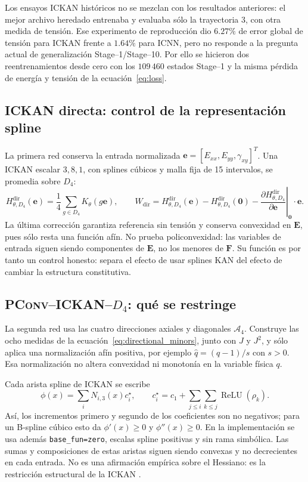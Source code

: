 \documentclass[11pt,a4paper]{article}
\newcommand{\E}{\ensuremath{\bm E}}
\newcommand{\F}{\ensuremath{\bm F}}
\newcommand{\evec}{\ensuremath{\bm e}}
\newcommand{\Dfour}{\ensuremath{D_4}}
\newcommand{\PConvICKAN}{\textsc{PConv--ICKAN--}\Dfour}
\begin{document}
Los ensayos ICKAN históricos no se mezclan con los resultados anteriores: el
mejor archivo heredado entrenaba y evaluaba sólo la trayectoria 3, con otra
medida de tensión. Ese experimento de reproducción dio \(6.27\%\) de error
global de tensión para ICKAN frente a \(1.64\%\) para ICNN, pero no responde a
la pregunta actual de generalización Stage--1/Stage--10. Por ello se hicieron
dos reentrenamientos desde cero con los \(109\,460\) estados Stage--1 y la
misma pérdida de energía y tensión de la ecuación~\eqref{eq:loss}.

\subsection{ICKAN directa: control de la representación spline}

La primera red conserva la entrada normalizada
\(\evec=[E_{xx},E_{yy},\gamma_{xy}]^T\). Una ICKAN escalar
\(3,8,1\), con splines cúbicos y malla fija de 15 intervalos, se promedia
sobre \(\Dfour\):
\[
 H_{\theta,\Dfour}^{\mathrm{dir}}(\evec)
 =\frac14\sum_{g\in\Dfour}K_\theta(g\evec),
 \qquad
 W_{\mathrm{dir}}=H_{\theta,\Dfour}^{\mathrm{dir}}(\evec)
 -H_{\theta,\Dfour}^{\mathrm{dir}}(\bm0)
 -\left.\frac{\partial H_{\theta,\Dfour}^{\mathrm{dir}}}{\partial\evec}
 \right|_{\bm0}\!\cdot\evec.
 \label{eq:ickan-direct}
\]
La última corrección garantiza referencia sin tensión y conserva convexidad
en \(\E\), pues sólo resta una función afín. No prueba policonvexidad: las
variables de entrada siguen siendo componentes de \(\E\), no los menores de
\(\F\). Su función es por tanto un control honesto: separa el efecto de usar
splines KAN del efecto de cambiar la estructura constitutiva.

\subsection{\texorpdfstring{\PConvICKAN{}}{PConv-ICKAN}: qué se restringe}

La segunda red usa las cuatro direcciones axiales y diagonales
\(\mathcal A_4\). Construye las ocho medidas de la
ecuación~\eqref{eq:directional_minors}, junto con \(J\) y \(J^2\), y sólo
aplica una normalización afín positiva, por ejemplo
\(\widehat q=(q-1)/s\) con \(s>0\). Esa normalización no altera convexidad
ni monotonía en la variable física \(q\).

Cada arista spline de ICKAN se escribe
\[
 \phi(x)=\sum_i N_{i,3}(x)c_i^\star,
 \qquad
 c_i^\star=c_1+\sum_{j\le i}\sum_{k\le j}\operatorname{ReLU}(\rho_k).
 \label{eq:ickan-spline}
\]
Así, los incrementos primero y segundo de los coeficientes son no negativos;
para un B-spline cúbico esto da \(\phi'(x)\ge0\) y
\(\phi''(x)\ge0\). En la implementación se usa además
\texttt{base\_fun=zero}, escalas spline positivas y sin rama simbólica. Las
sumas y composiciones de estas aristas siguen siendo convexas y no decrecientes
en cada entrada. No es una afirmación empírica sobre el Hessiano: es la
restricción estructural de la ICKAN \cite{thakolkaran2025}.
\end{document}
